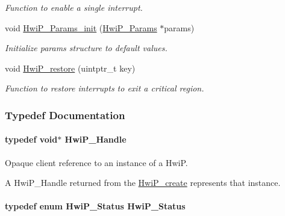 \begin{DoxyCompactItemize}
\begin{DoxyCompactList}\small\item\em Function to enable a single interrupt. \end{DoxyCompactList}\item 
void \hyperlink{_hwi_p_8h_a33f02161b1837b41f08ba064f1001045}{Hwi\+P\+\_\+\+Params\+\_\+init} (\hyperlink{struct_hwi_p___params}{Hwi\+P\+\_\+\+Params} $\ast$params)
\begin{DoxyCompactList}\small\item\em Initialize params structure to default values. \end{DoxyCompactList}\item 
void \hyperlink{_hwi_p_8h_a979cdfbd9993f6c5eedef8570efbd62e}{Hwi\+P\+\_\+restore} (uintptr\+\_\+t key)
\begin{DoxyCompactList}\small\item\em Function to restore interrupts to exit a critical region. \end{DoxyCompactList}\end{DoxyCompactItemize}


\subsubsection{Typedef Documentation}
\paragraph[{Hwi\+P\+\_\+\+Handle}]{\setlength{\rightskip}{0pt plus 5cm}typedef void$\ast$ {\bf Hwi\+P\+\_\+\+Handle}}\label{_hwi_p_8h_a7dd325ff62af296374efc6d317f5e368}


Opaque client reference to an instance of a Hwi\+P. 

A Hwi\+P\+\_\+\+Handle returned from the \hyperlink{_hwi_p_8h_a3d80df47f0bdcbb6e562ee7b96a40af5}{Hwi\+P\+\_\+create} represents that instance. 
\paragraph[{Hwi\+P\+\_\+\+Status}]{\setlength{\rightskip}{0pt plus 5cm}typedef enum {\bf Hwi\+P\+\_\+\+Status}  {\bf Hwi\+P\+\_\+\+Status}}\label{_hwi_p_8h_a1d0a42f3a5bb047cf6a14413f2a58e9f}


